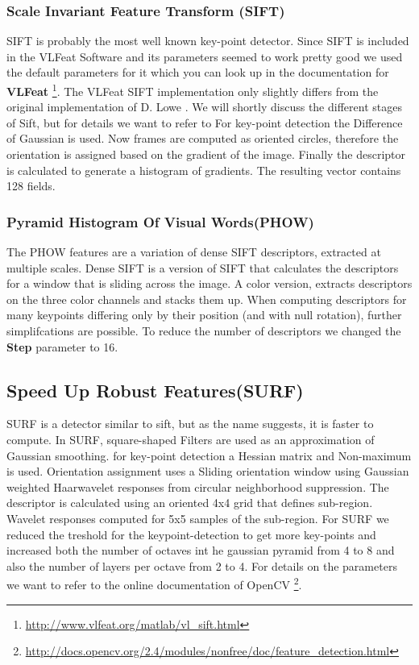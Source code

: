 \documentclass[10pt,a4paper]{article}
\begin{document}
\subsubsection{Scale Invariant Feature Transform (SIFT)}
SIFT is probably the most well known key-point detector. Since SIFT is included in the VLFeat Software and its parameters seemed to work pretty good we used the default parameters for it which you can look up in the documentation for \textbf{VLFeat} \footnote{\url{http://www.vlfeat.org/matlab/vl_sift.html} }. The VLFeat SIFT implementation only slightly differs from the original implementation of D. Lowe \cite{lowe}. We will shortly discuss the different stages of Sift, but for details we want to refer to \cite{}For key-point detection the Difference of Gaussian is used. Now frames are computed as oriented circles, therefore the orientation is assigned based on the gradient of the image. Finally the descriptor is calculated to generate a histogram of gradients. The resulting vector contains 128 fields.

\subsubsection{Pyramid Histogram Of Visual Words(PHOW)}
The PHOW \cite{phow} features are a variation of dense SIFT descriptors,
extracted at multiple scales. Dense SIFT is a version of SIFT that calculates the descriptors for a window that is sliding across the image. A color version, extracts descriptors
on the three color channels and stacks them up.
When computing descriptors for many keypoints differing only
by their position (and with null rotation), further
simplifcations are possible. To reduce the number of descriptors we changed the \textbf{Step} parameter to 16.

\subsection{Speed Up Robust Features(SURF)}
SURF \cite{surf} is a detector similar to sift, but as the name suggests, it is faster to compute. In SURF, square-shaped Filters are used as an approximation of Gaussian smoothing. for key-point detection a Hessian matrix and Non-maximum is used. Orientation assignment uses a Sliding orientation window using Gaussian weighted Haarwavelet responses from circular neighborhood suppression. The descriptor is calculated using an oriented 4x4 grid that defines sub-region.
Wavelet responses computed for 5x5 samples of the sub-region. For SURF we reduced the treshold  for the keypoint-detection to get more key-points and  increased both the number of octaves int he gaussian pyramid from 4 to 8 and also the number of layers per octave from 2 to 4. For details on the parameters we want to refer to the online documentation of OpenCV \footnote{\url{http://docs.opencv.org/2.4/modules/nonfree/doc/feature_detection.html}}.
\end{document}
